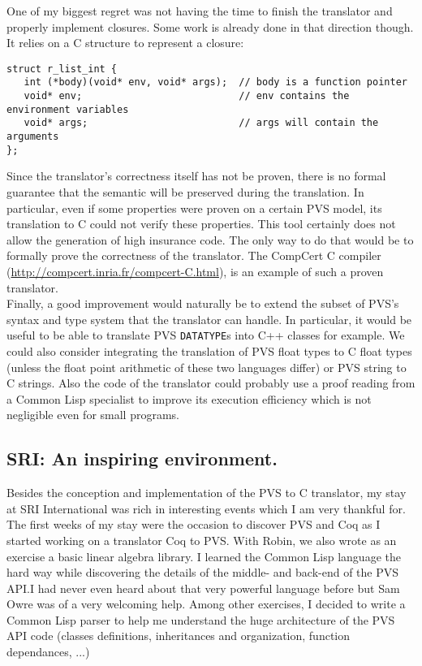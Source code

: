 \documentclass[12pt,a4paper]{article}
\newcommand{\cl}[1]{\texttt{#1}}
\begin{document}
One of my biggest regret was not having the time to finish the translator and properly implement closures. Some work is already done in that direction though. It relies on a C structure to represent a closure:
\begin{lstlisting}
struct r_list_int {
   int (*body)(void* env, void* args);  // body is a function pointer
   void* env;                           // env contains the environment variables
   void* args;                          // args will contain the arguments
};
\end{lstlisting}


Since the translator's correctness itself has not be proven, there is no formal guarantee that the semantic will be preserved during the translation. In particular, even if some properties were proven on a certain PVS model, its translation to C could not verify these properties. This tool certainly does not allow the generation of high insurance code. The only way to do that would be to formally prove the correctness of the translator. The CompCert C compiler (\href{http://compcert.inria.fr}{http://compcert.inria.fr/compcert-C.html}), is an example of such a proven translator. \\

Finally, a good improvement would naturally be to extend the subset of PVS's syntax and type system that the translator can handle. In particular, it would be useful to be able to translate PVS \cl{DATATYPE}s into C++ classes for example. We could also consider integrating the translation of PVS float types to C float types (unless the float point arithmetic of these two languages differ) or PVS string to C strings. Also the code of the translator could probably use a proof reading from a Common Lisp specialist to improve its execution efficiency which is not negligible even for small programs.


\subsection{SRI: An inspiring environment.}

Besides the conception and implementation of the PVS to C translator, my stay at SRI International was rich in interesting events which I am very thankful for. \\

The first weeks of my stay were the occasion to discover PVS and Coq as I started working on a translator Coq to PVS. With Robin, we also wrote as an exercise a basic linear algebra library. I learned the Common Lisp language the hard way while discovering the details of the middle- and back-end of the PVS API.I had never even heard about that very powerful language before but Sam Owre was of a very welcoming help. Among other exercises, I decided to write a Common Lisp parser to help me understand the huge architecture of the PVS API code (classes definitions, inheritances and organization, function dependances, ...)\\
\end{document}
